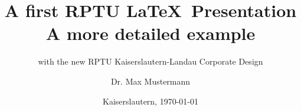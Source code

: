 \documentclass[aspectratio=169]{beamer}
\title[RPTU \LaTeX\ Presentation]{A first RPTU \LaTeX\ Presentation\\ A more detailed example}
\subtitle{with the new RPTU Kaiserslautern-Landau Corporate Design}
\date{Kaiserslautern, \today}
\author[Mustermann]{Dr. Max Mustermann}
\institute[Mathematik]{AG Statistik, FB Mathematik}
\begin{document}

\rptuthankyou %
\end{document}
